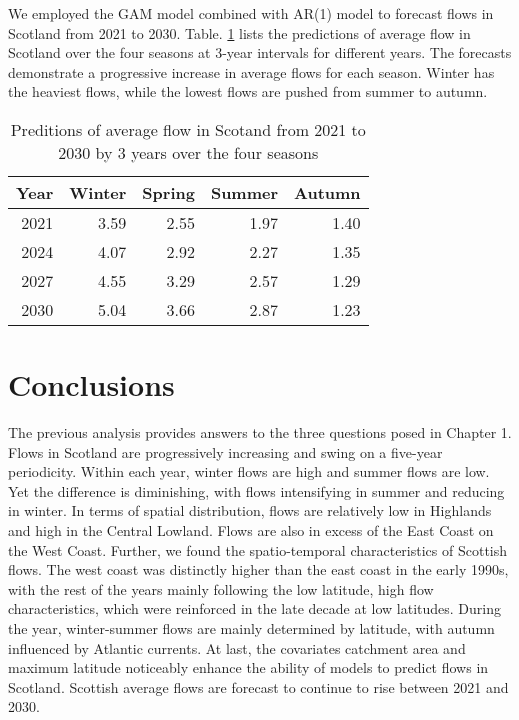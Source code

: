\documentclass[12pt,oneside]{reedthesis}
\begin{document}
We employed the GAM model combined with AR(1) model to forecast flows in Scotland from 2021 to 2030. Table. \ref{tab:pre} lists the predictions of average flow in Scotland over the four seasons at 3-year intervals for different years. The forecasts demonstrate a progressive increase in average flows for each season. Winter has the heaviest flows, while the lowest flows are pushed from summer to autumn.
\begin{table}[!h]

\caption{\label{tab:unnamed-chunk-17}\label{tab:pre} Preditions of average flow in Scotand from 2021 to 2030 by 3 years over the four seasons}
\centering
\fontsize{10}{12}\selectfont
\begin{tabular}[t]{rrrrr}
\toprule
Year & Winter & Spring & Summer & Autumn\\
\midrule
2021 & 3.59 & 2.55 & 1.97 & 1.40\\
2024 & 4.07 & 2.92 & 2.27 & 1.35\\
2027 & 4.55 & 3.29 & 2.57 & 1.29\\
2030 & 5.04 & 3.66 & 2.87 & 1.23\\
\bottomrule
\end{tabular}
\end{table}
\hypertarget{conclusions}{%
\section{Conclusions}\label{conclusions}}

The previous analysis provides answers to the three questions posed in Chapter 1. Flows in Scotland are progressively increasing and swing on a five-year periodicity. Within each year, winter flows are high and summer flows are low. Yet the difference is diminishing, with flows intensifying in summer and reducing in winter. In terms of spatial distribution, flows are relatively low in Highlands and high in the Central Lowland. Flows are also in excess of the East Coast on the West Coast. Further, we found the spatio-temporal characteristics of Scottish flows. The west coast was distinctly higher than the east coast in the early 1990s, with the rest of the years mainly following the low latitude, high flow characteristics, which were reinforced in the late decade at low latitudes. During the year, winter-summer flows are mainly determined by latitude, with autumn influenced by Atlantic currents. At last, the covariates catchment area and maximum latitude noticeably enhance the ability of models to predict flows in Scotland. Scottish average flows are forecast to continue to rise between 2021 and 2030.
\end{document}
